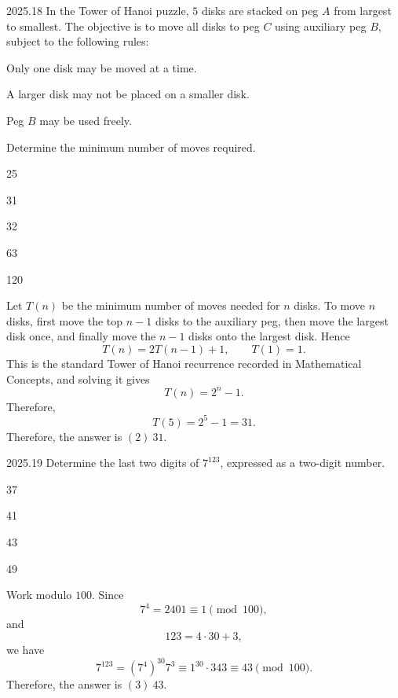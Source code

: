     \begin{pastproblem}{2025.18}
        In the Tower of Hanoi puzzle, $5$ disks are stacked on peg $A$ from largest to smallest.
        The objective is to move all disks to peg $C$ using auxiliary peg $B$, subject to the
        following rules:
        \begin{problemchoices}
            \item Only one disk may be moved at a time.
            \item A larger disk may not be placed on a smaller disk.
            \item Peg $B$ may be used freely.
        \end{problemchoices}
        Determine the minimum number of moves required.
        \begin{problemchoices}
            \item 25
            \item 31
            \item 32
            \item 63
            \item 120
        \end{problemchoices}
    \end{pastproblem}

    \begin{solution}
        Let $T(n)$ be the minimum number of moves needed for $n$ disks. To move $n$ disks, first
        move the top $n-1$ disks to the auxiliary peg, then move the largest disk once, and finally
        move the $n-1$ disks onto the largest disk. Hence
        \[
            T(n)=2T(n-1)+1,
            \qquad
            T(1)=1.
        \]
        This is the standard Tower of Hanoi recurrence recorded in Mathematical
        Concepts, and solving it gives
        \[
            T(n)=2^n-1.
        \]
        Therefore,
        \[
            T(5)=2^5-1=31.
        \]
        Therefore, the answer is $\boxed{(2)\ 31}$.
    \end{solution}

    \begin{pastproblem}{2025.19}
        Determine the last two digits of $7^{123}$, expressed as a two-digit number.
        \begin{problemchoices}
            \item 37
            \item 41
            \item 43
            \item 49
        \end{problemchoices}
    \end{pastproblem}

    \begin{solution}
        Work modulo $100$. Since
        \[
            7^4=2401\equiv 1\pmod{100},
        \]
        and
        \[
            123=4\cdot 30+3,
        \]
        we have
        \[
            7^{123}
            =
            (7^4)^{30}7^3
            \equiv
            1^{30}\cdot 343
            \equiv
            43
            \pmod{100}.
        \]
        Therefore, the answer is $\boxed{(3)\ 43}$.
    \end{solution}
